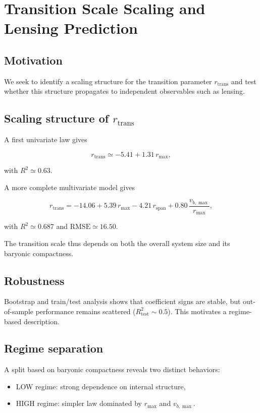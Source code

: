 \documentclass[11pt]{article}
\begin{document}
\section{Transition Scale Scaling and Lensing Prediction}

\subsection{Motivation}

We seek to identify a scaling structure for the transition parameter
$r_{\mathrm{trans}}$ and test whether this structure propagates to
independent observables such as lensing.

\subsection{Scaling structure of $r_{\mathrm{trans}}$}

A first univariate law gives

\[
r_{\mathrm{trans}} \simeq -5.41 + 1.31\,r_{\max},
\]

with $R^2 \simeq 0.63$.

A more complete multivariate model gives

\[
r_{\mathrm{trans}}
=
-14.06 + 5.39\,r_{\max}
- 4.21\,r_{\mathrm{span}}
+ 0.80\,\frac{v_{b,\max}}{r_{\max}},
\]

with $R^2 \simeq 0.687$ and $\mathrm{RMSE} \simeq 16.50$.

The transition scale thus depends on both the overall system size
and its baryonic compactness.

\subsection{Robustness}

Bootstrap and train/test analysis shows that coefficient signs are
stable, but out-of-sample performance remains scattered
($R^2_{\mathrm{test}} \sim 0.5$). This motivates a regime-based
description.

\subsection{Regime separation}

A split based on baryonic compactness reveals two distinct behaviors:

\begin{itemize}
\item LOW regime: strong dependence on internal structure,
\item HIGH regime: simpler law dominated by $r_{\max}$ and $v_{b,\max}$.
\end{itemize}
\end{document}
